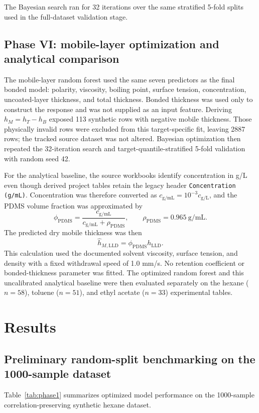 \documentclass[11pt]{article}
\begin{document}
The Bayesian search ran for 32 iterations over the same stratified 5-fold splits used in the full-dataset validation stage.

\subsection{Phase VI: mobile-layer optimization and analytical comparison}
The mobile-layer random forest used the same seven predictors as the final bonded model: polarity, viscosity, boiling point, surface tension, concentration, uncoated-layer thickness, and total thickness. Bonded thickness was used only to construct the response and was not supplied as an input feature. Deriving $h_M=h_T-h_B$ exposed 113 synthetic rows with negative mobile thickness. Those physically invalid rows were excluded from this target-specific fit, leaving 2887 rows; the tracked source dataset was not altered. Bayesian optimization then repeated the 32-iteration search and target-quantile-stratified 5-fold validation with random seed 42.

For the analytical baseline, the source workbooks identify concentration in g/L even though derived project tables retain the legacy header \texttt{Concentration (g/mL)}. Concentration was therefore converted as $c_{\mathrm{g/mL}}=10^{-3}c_{\mathrm{g/L}}$, and the PDMS volume fraction was approximated by
\begin{equation}
\phi_{\mathrm{PDMS}}=\frac{c_{\mathrm{g/mL}}}{c_{\mathrm{g/mL}}+\rho_{\mathrm{PDMS}}},
\qquad \rho_{\mathrm{PDMS}}=0.965\ \mathrm{g/mL}.
\end{equation}
The predicted dry mobile thickness was then
\begin{equation}
\hat{h}_{M,\mathrm{LLD}}=\phi_{\mathrm{PDMS}}h_{\mathrm{LLD}}.
\end{equation}
This calculation used the documented solvent viscosity, surface tension, and density with a fixed withdrawal speed of 1.0 mm/s. No retention coefficient or bonded-thickness parameter was fitted. The optimized random forest and this uncalibrated analytical baseline were then evaluated separately on the hexane ($n=58$), toluene ($n=51$), and ethyl acetate ($n=33$) experimental tables.

\section{Results}

\subsection{Preliminary random-split benchmarking on the 1000-sample dataset}
Table~\ref{tab:phase1} summarizes optimized model performance on the 1000-sample correlation-preserving synthetic hexane dataset.
\end{document}
